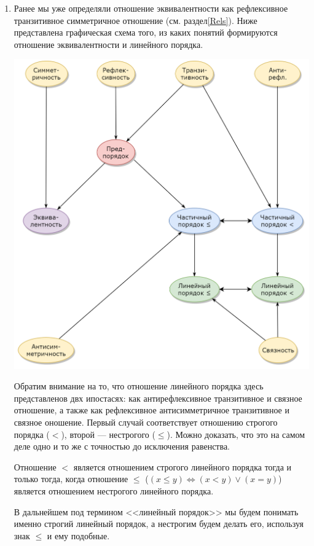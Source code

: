 \begin{enumerate}
\item Ранее мы уже определяли отношение эквивалентности как рефлексивное транзитивное симметричное отношение (см. раздел\ref{Rels}). Ниже представлена графическая схема того, из каких понятий формируются отношение эквивалентности и линейного порядка.
\begin{center}
\includegraphics[scale=0.4]{RelOrder.png}
\end{center}

Обратим внимание на то, что отношение линейного порядка здесь представленов двх ипостасях: как антирефлексивное транзитивное и связное отношение, а также как рефлексивное антисимметричное транзитивное и связное оношение. Первый случай соответствует отношению строгого порядка ($<$), второй --- нестрогого ($\le$). Можно доказать, что это на самом деле одно и то же с точностью до исключения равенства.

\begin{lem} Отношение $<$ является отношением строгого линейного порядка тогда и только тогда, когда отношение $\le$ ($(x\le y)\Leftrightarrow (x<y)\lor (x=y)$) является отношением нестрогого линейного порядка.
\end{lem}

В дальнейшем под термином <<линейный порядок>> мы будем понимать именно строгий линейный порядок, а нестрогим будем делать его, используя знак $\le$ и ему подобные.


\end{enumerate}
